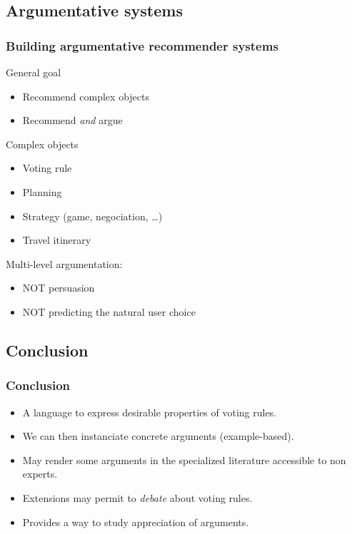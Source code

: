 \documentclass[english]{beamer}
\begin{document}
\subsection{Argumentative systems}
\begin{frame}
	\frametitle{Building argumentative recommender systems}
	
	\begin{block}{General goal}
		\begin{itemize}
			\item Recommend complex objects
			\item Recommend \emph{and} argue
		\end{itemize}
	\end{block}
	\begin{block}{Complex objects}
		\begin{itemize}
			\item Voting rule
			\item Planning
			\item Strategy (game, negociation, …)
			\item Travel itinerary
		\end{itemize}
	\end{block}
	Multi-level argumentation:
	\begin{itemize}
		\item NOT persuasion
		\item NOT predicting the natural user choice
	\end{itemize}
\end{frame}

\subsection{Conclusion}
\begin{frame}
	\frametitle{Conclusion}
	
	\begin{itemize}
		\item A language to express desirable properties of voting rules.
		\item We can then instanciate concrete arguments (example-based).
		\item May render some arguments in the specialized literature accessible to non experts.
		\item Extensions may permit to \emph{debate} about voting rules.
		\item Provides a way to study appreciation of arguments.
	\end{itemize}
\end{frame}
\end{document}
